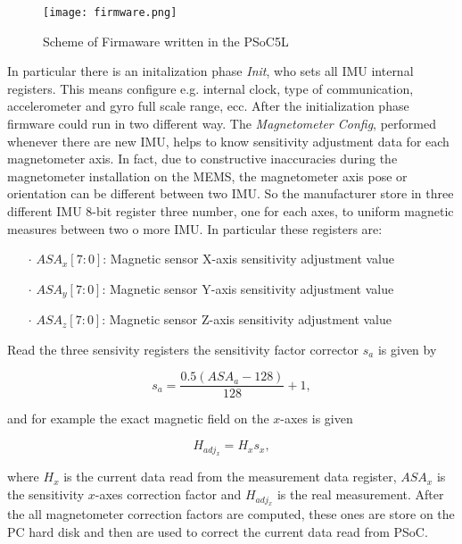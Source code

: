 \begin{figure}[h]
\centering
\texttt{[image: firmware.png]}
\caption{Scheme of Firmaware written in the PSoC5L}
\label{fig:psocfirmware}
\end{figure}  

In particular there is an initalization phase \textit{Init}, who sets all IMU internal registers. This means configure e.g. internal clock, type of communication, accelerometer and gyro full scale range, ecc. 
After the initialization phase firmware could run in two different way. The \textit{Magnetometer Config}, performed whenever there are new IMU, helps to know sensitivity adjustment data for each magnetometer axis. In fact, due to constructive inaccuracies during the magnetometer installation on the MEMS, the magnetometer axis pose or orientation can be different between two IMU. So the manufacturer store in three different IMU 8-bit register three number, one for each axes, to uniform magnetic measures between two o more IMU. In particular these registers are:

\begin{enumerate}
\item[$\cdot$] $ASA_x[7:0]$: Magnetic sensor X-axis sensitivity adjustment value
\item[$\cdot$] $ASA_y[7:0]$: Magnetic sensor Y-axis sensitivity adjustment value
\item[$\cdot$] $ASA_z[7:0]$: Magnetic sensor Z-axis sensitivity adjustment value
\end{enumerate}

Read the three sensivity registers the sensitivity factor corrector $s_a$ is given by %

\begin{equation}
s_a  = \frac{ 0.5(ASA_a - 128)}{128} + 1,
\end{equation} 

\noindent and for example the exact magnetic field on the $x$-axes is given

\begin{equation}
H_{{adj}_x} = H_x s_x,
\end{equation} 

\noindent where $H_x$ is the current data read from the measurement data register, $ASA_x$ is the sensitivity $x$-axes correction factor and $H_{{adj}_x}$ is the real measurement. 
After the all magnetometer correction factors are computed, these ones are store on the PC hard disk and then are used to correct the current data read from PSoC. %

